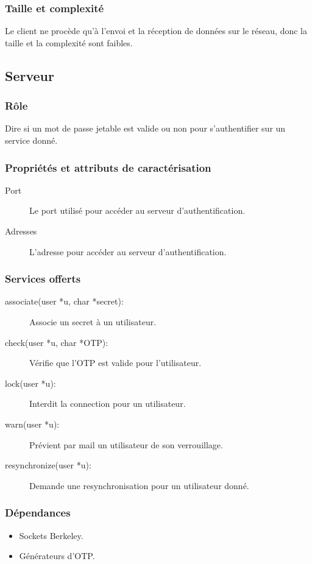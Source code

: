 \documentclass{"../../res/univ-projet"}
\begin{document}
    \subsubsection{Taille et complexité}
        Le client ne procède qu'à l'envoi et la réception de données sur le
        réseau, donc la taille et la complexité sont faibles.

\subsection{Serveur}
    \subsubsection{Rôle}
    Dire si un mot de passe jetable est valide ou non pour s'authentifier sur un
    service donné.

    \subsubsection{Propriétés et attributs de caractérisation}
    \begin{description}
        \item[Port] Le port utilisé pour accéder au serveur
            d'authentification.
        \item[Adresses] L'adresse pour accéder au serveur 
            d'authentification.
    \end{description}

    \subsubsection{Services offerts}
    \begin{description}
        \item[associate(user *u, char *secret):] Associe un secret à un 
            utilisateur.
        \item[check(user *u, char *OTP):] Vérifie que l'OTP est valide pour
            l'utilisateur.
        \item[lock(user *u):] Interdit la connection pour un utilisateur.
        \item[warn(user *u):] Prévient par mail un utilisateur de son 
            verrouillage.
        \item[resynchronize(user *u):] Demande une resynchronisation pour
            un utilisateur donné.
    \end{description}

    \subsubsection{Dépendances}
    \begin{itemize}
        \item Sockets Berkeley.
        \item Générateurs d'OTP.
    \end{itemize}
\end{document}
